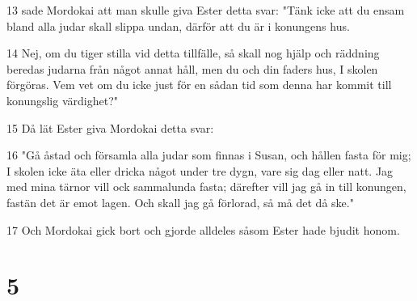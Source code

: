 \par 13 sade Mordokai att man skulle giva Ester detta svar: "Tänk icke att du ensam bland alla judar skall slippa undan, därför att du är i konungens hus.
\par 14 Nej, om du tiger stilla vid detta tillfälle, så skall nog hjälp och räddning beredas judarna från något annat håll, men du och din faders hus, I skolen förgöras. Vem vet om du icke just för en sådan tid som denna har kommit till konungslig värdighet?"
\par 15 Då lät Ester giva Mordokai detta svar:
\par 16 "Gå åstad och församla alla judar som finnas i Susan, och hållen fasta för mig; I skolen icke äta eller dricka något under tre dygn, vare sig dag eller natt. Jag med mina tärnor vill ock sammalunda fasta; därefter vill jag gå in till konungen, fastän det är emot lagen. Och skall jag gå förlorad, så må det då ske."
\par 17 Och Mordokai gick bort och gjorde alldeles såsom Ester hade bjudit honom.

\chapter{5}


